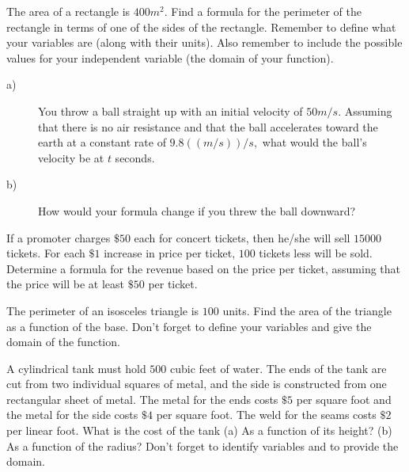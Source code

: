 \begin{ProblemSection}
  \begin{myproblem}{}
    The area of a rectangle is $400 m^2.$  Find a formula for the
    perimeter of the rectangle in terms of one of the sides of the
    rectangle.  Remember to define what your variables are (along with
    their units).  Also remember to include the possible values for
    your independent variable (the domain of your function).
  \end{myproblem}
  \begin{myproblem}{}
    \begin{description}
    \item[a)] You throw a ball straight up with an initial velocity of
      $50 m/s.$ Assuming that there is no air resistance and that the
      ball accelerates toward the earth at a constant rate of
      $9.8 ((m/s))/s,$ what would the ball's velocity be at $t$
      seconds.
   \item[b)] How would your formula change if you threw the ball
     downward?
    \end{description}
  \end{myproblem}
  \begin{myproblem}{}
    If a promoter charges $\$50$ each for concert tickets, then he/she
    will sell $15000$ tickets.  For each $\$1$ increase in price per
    ticket, $100$ tickets less will be sold.  Determine a formula for
    the revenue based on the price per ticket, assuming that the price
    will be at least $\$50$ per ticket.
  \end{myproblem}
  \begin{myproblem}{}
    The perimeter of an isosceles triangle is $100$ units.  Find the
    area of the triangle as a function of the base.  Don't forget to
    define your variables and give the domain of the function.
  \end{myproblem}
  \begin{myproblem}{}
    A cylindrical tank must hold $500$ cubic feet of water.  The ends of
    the tank are cut from two individual squares of metal, and the
    side is constructed from one rectangular sheet of metal.  The
    metal for the ends costs $\$5$ per square foot and the metal for the
    side costs $\$4$ per square foot.  The weld for the seams costs $\$2$
    per linear foot.  What is the cost of the tank (a) As a function of
    its height?  (b)  As a function of the radius?  Don't forget
    to identify variables and to provide the domain.
  \end{myproblem}

\end{ProblemSection}
